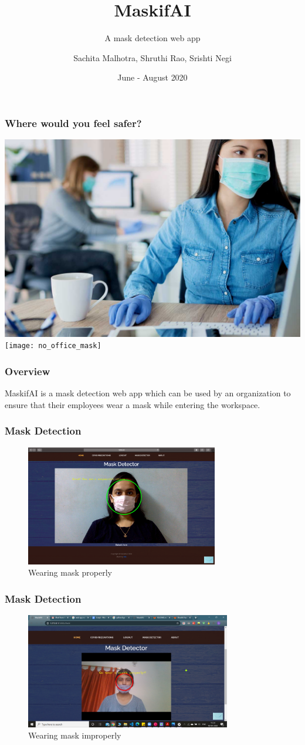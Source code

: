 \documentclass[14pt]{beamer}
\title{MaskifAI}
\subtitle{A mask detection web app}
\author[TEAM 6]{Sachita Malhotra, Shruthi Rao, Srishti Negi}
\date{June - August 2020}
\begin{document}
\begin{frame}
    \titlepage
\end{frame}

\begin{frame}
    \frametitle{Where would you feel safer?}
    \centering
    \includegraphics[width=4.5 cm,height=3.5 cm]{office_mask}
    \texttt{[image: no\_office\_mask]}
\end{frame}

\begin{frame}
    \frametitle{Overview}
    MaskifAI is a mask detection web app which can be used by an organization to ensure that their employees wear a mask while entering the workspace.
\end{frame}

\begin{frame}
    \frametitle{Mask Detection}
    \begin{figure}
    \caption{Wearing mask properly}
    \centering
    \includegraphics[width=0.75\textwidth]{mask_true}
    \end{figure}
\end{frame}

\begin{frame}
    \frametitle{Mask Detection}
    \begin{figure}
    \caption{Wearing mask improperly}
    \centering
    \includegraphics[width=0.8\textwidth]{improper_mask}
    \end{figure}
\end{frame}
\end{document}
